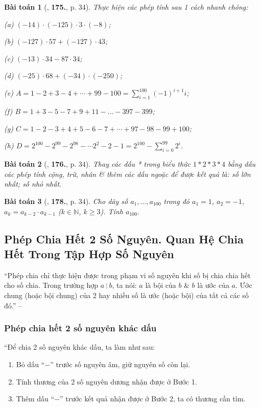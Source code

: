 \documentclass{article}
\numberwithin{equation}{section}
\newtheorem{baitoan}{Bài toán}[section]
\begin{document}
\begin{baitoan}[\cite{Binh_Toan_6_tap_1}, \textbf{175.}, p. 34]
	Thực hiện các phép tính sau 1 cách nhanh chóng:
	\begin{enumerate*}
		\item[(a)] $(-14)\cdot(-125)\cdot3\cdot(-8)$;
		\item[(b)] $(-127)\cdot 57 + (-127)\cdot 43$;
		\item[(c)] $(-13)\cdot 34 - 87\cdot 34$;
		\item[(d)] $(-25)\cdot 68 + (-34)\cdot(-250)$;
		\item[(e)] $A = 1 - 2 + 3 - 4 + \cdots + 99 - 100 = \sum_{i=1}^{100} (-1)^{i+1} i$;
		\item[(f)] $B = 1 + 3 - 5 - 7 + 9 + 11 - \ldots - 397 - 399$;
		\item[(g)] $C = 1 - 2 - 3 + 4 + 5 - 6 - 7 + \cdots + 97 - 98 - 99 + 100$;
		\item[(h)] $D = 2^{100} - 2^{99} - 2^{98} - \cdots 2^2 - 2 - 1 = 2^{100} - \sum_{i=0}^{99} 2^i$.
	\end{enumerate*}
\end{baitoan}

\begin{baitoan}[\cite{Binh_Toan_6_tap_1}, \textbf{176.}, p. 34]
	Thay các dấu * trong biểu thức $1*2*3*4$ bằng dấu các phép tính cộng, trừ, nhân \& thêm các dấu ngoặc để được kết quả là: số lớn nhất; số nhỏ nhất.
\end{baitoan}

\begin{baitoan}[\cite{Binh_Toan_6_tap_1}, \textbf{178.}, p. 34]
	Cho dãy số $a_1,\ldots,a_{100}$ trong đó $a_1 = 1$, $a_2 = -1$, $a_k = a_{k-2}\cdot a_{k-1}$ ($k\in\mathbb{N}$, $k\ge 3$). Tính $a_{100}$.
\end{baitoan}


\subsection{Phép Chia Hết 2 Số Nguyên. Quan Hệ Chia Hết Trong Tập Hợp Số Nguyên}
``Phép chia chỉ thực hiện được trong phạm vi số nguyên khi số bị chia chia hết cho số chia. Trong trường hợp $a\ \vdots\ b$, ta nói: $a$ là bội của $b$ \& $b$ là ước của $a$. Ước chung (hoặc bội chung) của 2 hay nhiều số là ước (hoặc bội) của tất cả các số đó.'' -- \cite[p. 32]{Binh_Toan_6_tap_1}

\subsubsection{Phép chia hết 2 số nguyên khác dấu}
``Để chia 2 số nguyên khác dấu, ta làm như sau:
\begin{enumerate}
	\item Bỏ dấu ``$-$'' trước số nguyên âm, giữ nguyên số còn lại.
	\item Tính thương của 2 số nguyên dương nhận được ở Bước 1.
	\item Thêm dấu ``$-$'' trước kết quả nhận được ở Bước 2, ta có thương cần tìm.
\end{enumerate}
\end{document}
